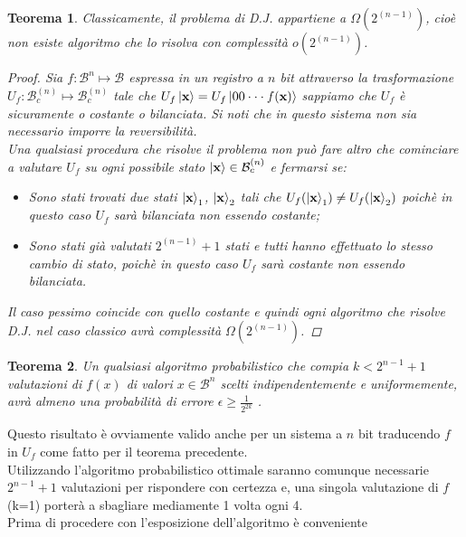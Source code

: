 \documentclass[12pt,a4paper,openright]{report}
\newtheorem{mythm}{Teorema}[chapter]
\begin{document}
\begin{mythm}
 Classicamente, il problema di D.J. appartiene a $\Omega(2^{(n-1)})$, cioè non esiste algoritmo che lo risolva con complessità $o(2^{(n-1)})$.
 \begin{proof}
     Sia $f:\mathcal{B}^n\mapsto\mathcal{B}$ espressa in un registro a $n$ bit attraverso la trasformazione $U_f: \mathcal{B}_c^{(n)} \mapsto \mathcal{B}_c^{(n)}$ tale che $U_f\ket{\textbf{x}}=U_f\ket{00\cdot\cdot\cdot f(\textbf{x})}$ sappiamo che $U_f$ è sicuramente o costante o bilanciata.
     Si noti che in questo sistema non sia necessario imporre la reversibilità.\\
     Una qualsiasi procedura che risolve il problema non può fare altro che cominciare a valutare $U_f$ su ogni possibile stato $\ket{\textbf{x}}\in{\mathcal{B}_c^{(n)}}$ e fermarsi se:
     \begin{itemize}
         \item Sono stati trovati due stati $\ket{\textbf{x}}_1$, $\ket{\textbf{x}}_2$ tali che $U_f(\ket{\textbf{x}}_1) \ne U_f(\ket{\textbf{x}}_2)$ poichè in questo caso $U_f$ sarà bilanciata non essendo costante;
         \item Sono stati già valutati $2^{(n-1)}+1$ stati e tutti hanno effettuato lo stesso cambio di stato, poichè in questo caso $U_f$ sarà costante non essendo bilanciata.
     \end{itemize} 
     Il caso pessimo coincide con quello costante e quindi ogni algoritmo che risolve D.J. nel caso classico avrà complessità $\Omega(2^{(n-1)})$.
 \end{proof}
\end{mythm}

\begin{mythm}
    Un qualsiasi algoritmo probabilistico che compia $k<2^{n-1}+1$ valutazioni di $f(x)$ di valori $x\in\mathcal{B}^n$ scelti indipendentemente e uniformemente, avrà almeno una probabilità di errore $\epsilon \geq \frac{1}{2^{2k}}$ \cite{ref17}. 
\end{mythm}
Questo risultato è ovviamente valido anche per un sistema a $n$ bit traducendo $f$ in $U_f$ come fatto per il teorema precedente.\\
Utilizzando l'algoritmo probabilistico ottimale saranno comunque necessarie $2^{n-1} + 1$ valutazioni per rispondere con certezza e, una singola valutazione di $f$ (k=1) porterà a sbagliare mediamente 1 volta ogni 4.\\

\newpage
Prima di procedere con l'esposizione dell'algoritmo è conveniente 
\end{document}

